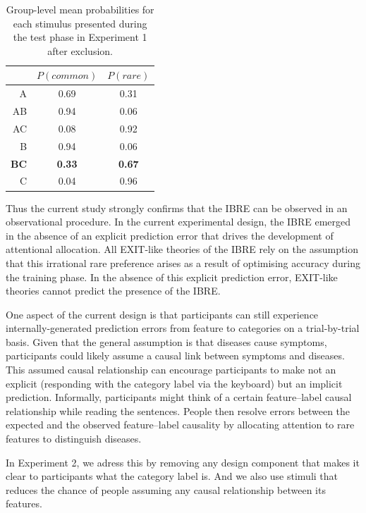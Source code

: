 \documentclass[10pt,letterpaper]{article}
\begin{document}
\begin{table}[ht]
  \begin{center}
    \caption{Group-level mean probabilities for each stimulus presented during the test phase in Experiment 1 after exclusion. \\}
    \label{tab:results-exp1}
    \vskip 0.12in
    \begin{tabular}{rcc}
      \hline
      & $P(common)$ & $P(rare)$ \\
      \hline
      A & 0.69 & 0.31 \\
      AB & 0.94 & 0.06 \\
      AC & 0.08 & 0.92 \\
      B & 0.94 & 0.06 \\
      \textbf{BC} & \textbf{0.33} & \textbf{0.67} \\
      C & 0.04 & 0.96 \\
    \end{tabular}
  \end{center}
\end{table}

Thus the current study strongly confirms that the IBRE can be observed in an observational procedure.
In the current experimental design, the IBRE emerged in the absence of an explicit prediction error that drives the development of attentional allocation.
All EXIT-like theories of the IBRE rely on the assumption that this irrational rare preference arises as a result of optimising accuracy during the training phase.
In the absence of this explicit prediction error, EXIT-like theories cannot predict the presence of the IBRE.

One aspect of the current design is that participants can still experience internally-generated prediction errors from feature to categories on a trial-by-trial basis.
Given that the general assumption is that diseases cause symptoms, participants could likely assume a causal link between symptoms and diseases.
This assumed causal relationship can encourage participants to make not an explicit (responding with the category label via the keyboard) but an implicit prediction.
Informally, participants might think of a certain feature--label causal relationship while reading the sentences.
People then resolve errors between the expected and the observed feature--label causality by allocating attention to rare features to distinguish diseases.

In Experiment 2, we adress this by removing any design component that makes it clear to participants what the category label is.
And we also use stimuli that reduces the chance of people assuming any causal relationship between its features.
\end{document}
